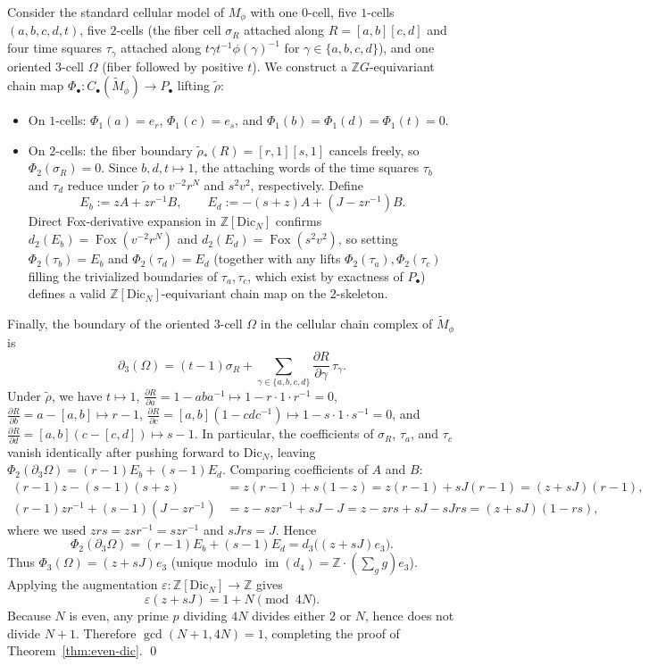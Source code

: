 \documentclass[11pt]{amsart}
\theoremstyle{definition}
\theoremstyle{remark}
\newcommand{\Z}{\mathbb{Z}}
\newcommand{\Dic}{\mathrm{Dic}}
\begin{document}
Consider the standard cellular model of $M_\phi$ with one $0$-cell, five $1$-cells $(a,b,c,d,t)$, five $2$-cells (the fiber cell $\sigma_R$ attached along $R=[a,b][c,d]$ and four time squares $\tau_\gamma$ attached along $t\gamma t^{-1}\phi(\gamma)^{-1}$ for $\gamma\in\{a,b,c,d\}$), and one oriented $3$-cell $\Omega$ (fiber followed by positive $t$).
We construct a $\Z G$-equivariant chain map $\Phi_\bullet\colon C_\bullet(\widetilde{M}_\phi) \to P_\bullet$ lifting $\tilde{\rho}$:
\begin{itemize}
    \item On $1$-cells: $\Phi_1(a)=e_r$, $\Phi_1(c)=e_s$, and $\Phi_1(b)=\Phi_1(d)=\Phi_1(t)=0$.
    \item On $2$-cells: the fiber boundary $\tilde{\rho}_*(R)=[r,1][s,1]$ cancels freely, so $\Phi_2(\sigma_R)=0$.
    Since $b,d,t \mapsto 1$, the attaching words of the time squares $\tau_b$ and $\tau_d$ reduce under $\tilde{\rho}$ to $v^{-2}r^N$ and $s^2 v^2$, respectively. Define
    \[
        E_b := z A + z r^{-1} B, \qquad E_d := -(s+z)A + (J - z r^{-1})B.
    \]
    Direct Fox-derivative expansion in $\Z[\Dic_N]$ confirms $d_2(E_b) = \operatorname{Fox}(v^{-2}r^N)$ and $d_2(E_d) = \operatorname{Fox}(s^2 v^2)$, so setting $\Phi_2(\tau_b) = E_b$ and $\Phi_2(\tau_d) = E_d$ (together with any lifts $\Phi_2(\tau_a), \Phi_2(\tau_c)$ filling the trivialized boundaries of $\tau_a, \tau_c$, which exist by exactness of $P_\bullet$) defines a valid $\Z[\Dic_N]$-equivariant chain map on the $2$-skeleton.
\end{itemize}
Finally, the boundary of the oriented $3$-cell $\Omega$ in the cellular chain complex of $\widetilde{M}_\phi$ is
\[
    \partial_3(\Omega) = (t-1)\sigma_R + \sum_{\gamma\in\{a,b,c,d\}} \frac{\partial R}{\partial \gamma}\,\tau_\gamma.
\]
Under $\tilde{\rho}$, we have $t\mapsto 1$, $\frac{\partial R}{\partial a} = 1-aba^{-1} \mapsto 1-r\cdot 1\cdot r^{-1}=0$, $\frac{\partial R}{\partial b} = a-[a,b] \mapsto r-1$, $\frac{\partial R}{\partial c} = [a,b](1-cdc^{-1}) \mapsto 1-s\cdot 1\cdot s^{-1}=0$, and $\frac{\partial R}{\partial d} = [a,b](c-[c,d]) \mapsto s-1$.
In particular, the coefficients of $\sigma_R$, $\tau_a$, and $\tau_c$ vanish identically after pushing forward to $\Dic_N$, leaving $\Phi_2(\partial_3\Omega) = (r-1)E_b + (s-1)E_d$.
Comparing coefficients of $A$ and $B$:
\begin{align*}
    (r-1)z - (s-1)(s+z) &= z(r-1) + s(1-z) = z(r-1) + sJ(r-1) = (z+sJ)(r-1), \\
    (r-1)zr^{-1} + (s-1)(J-zr^{-1}) &= z - szr^{-1} + sJ - J = z - zrs + sJ - sJrs = (z+sJ)(1-rs),
\end{align*}
where we used $zrs = zsr^{-1} = szr^{-1}$ and $sJrs = J$. Hence
\[
    \Phi_2(\partial_3\Omega) = (r-1)E_b + (s-1)E_d = d_3\bigl((z+sJ)e_3\bigr).
\]
Thus $\Phi_3(\Omega) = (z+sJ)e_3$ (unique modulo $\operatorname{im}(d_4) = \Z\cdot(\sum_{g} g)e_3$).
Applying the augmentation $\varepsilon\colon \Z[\Dic_N]\to\Z$ gives
\[
    \varepsilon(z + sJ) = 1 + N \pmod{4N}.
\]
Because $N$ is even, any prime $p$ dividing $4N$ divides either $2$ or $N$, hence does not divide $N+1$. Therefore $\gcd(N+1,4N)=1$, completing the proof of Theorem~\ref{thm:even-dic}. \qed
\end{document}
